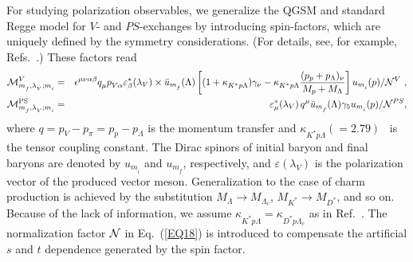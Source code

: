 \documentclass[a4paper,12pt]{article}
\begin{document}
For studying polarization observables, we generalize the QGSM and standard Regge model for $V$- and $PS$-exchanges
by introducing spin-factors, which are uniquely defined by the symmetry considerations.
(For details, see, for example, Refs.~\cite{TK08,KHKN15,KKH16,SOT}.)
These factors read
\begin{eqnarray}
{\cal {M}}^V_{m_f^{},\lambda_V^{};m_i^{}} &=&
\epsilon^{\mu\nu\alpha\beta} q_{\mu}^{} p_{V\alpha}^{} \varepsilon^*_\beta (\lambda_V)
\times \bar u_{m_f^{}}(\Lambda)
\left[ (1+\kappa_{K^*p\Lambda}^{}) \gamma_\nu  - \kappa_{K^*p\Lambda}^{}
\frac{(p_p+p_\Lambda)_\nu}{M_p+M_\Lambda} \right] u_{m_i^{}}(p)/\mathcal{N}^V~,\nonumber\\
{\cal M}^{\rm PS}_{m_f^{},\lambda_V^{};m_i^{}} &=& \varepsilon^{*}_\mu(\lambda_V)\,q^\mu
\bar u_{m_f^{}}(\Lambda) \gamma_5 u_{m_i^{}}(p)/ \mathcal{N}^{PS},
\label{EQ18}
\end{eqnarray}
where $q = p_V^{} - p_\pi^{} = p_p^{} - p_\Lambda^{}$ is the momentum transfer and
$\kappa_{K^*p\Lambda}^{} (= 2.79)$~\cite{TK08} is the tensor coupling constant.
The Dirac spinors of initial baryon and final baryons are denoted by $u_{m_i^{}}$ and $u_{m_f^{}}$, respectively,
and $\varepsilon (\lambda_V^{})$ is the polarization vector of the produced vector meson.
Generalization to the case of charm production is achieved by the substitution
$M_\Lambda \to M_{\Lambda_c}$, $M_{K^*} \to M_{D^*}$, and so on.
Because of the lack of information, we assume $\kappa_{K^*p\Lambda}^{} = \kappa_{D^*p\Lambda_c}^{}$
as in Ref.~\cite{CERN-MPI-78}.
The normalization factor $\cal N$ in Eq.~(\ref{EQ18}) is introduced
to compensate the artificial $s$ and $t$ dependence generated by the spin factor.
\end{document}
